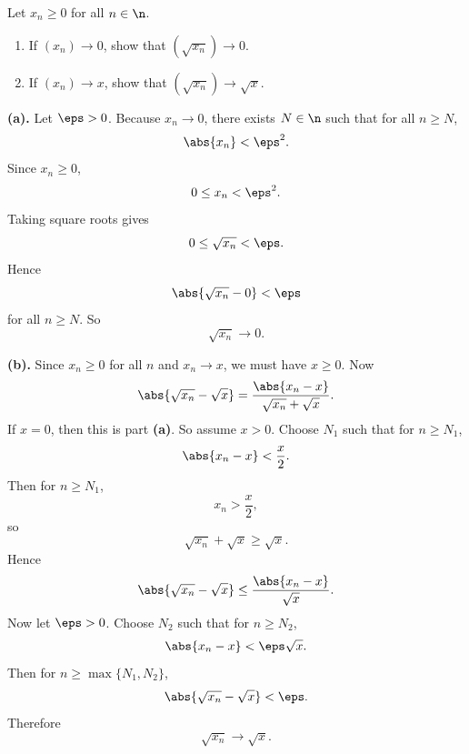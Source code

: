 \begin{problem}{
    Let $x_n\geq0$ for all $n\in\n$.
    \begin{enumerate}[label={(\alph*)}]
\item If $(x_n)\to0$, show that $(\sqrt{x_n})\to0$.
\item If $(x_n)\to x$, show that $(\sqrt{x_n})\to\sqrt{x}$.
    \end{enumerate}
}
    \textbf{(a).}
    Let $\eps>0$.
    Because $x_n\to0$, there exists $N\in\n$ such that for all $n\geq N$,
    \[
        \abs{x_n}<\eps^2.
    \]
    Since $x_n\geq0$,
    \[
        0\leq x_n<\eps^2.
    \]
    Taking square roots gives
    \[
        0\leq \sqrt{x_n}<\eps.
    \]
    Hence
    \[
        \abs{\sqrt{x_n}-0}<\eps
    \]
    for all $n\geq N$.
    So
    \[
        \sqrt{x_n}\to0.
    \]

    \textbf{(b).}
    Since $x_n\geq0$ for all $n$ and $x_n\to x$, we must have $x\geq0$.
    Now
    \[
        \abs{\sqrt{x_n}-\sqrt{x}}
        =
        \frac{\abs{x_n-x}}{\sqrt{x_n}+\sqrt{x}}.
    \]
    If $x=0$, then this is part \textbf{(a)}.
    So assume $x>0$.
    Choose $N_1$ such that for $n\geq N_1$,
    \[
        \abs{x_n-x}<\frac{x}{2}.
    \]
    Then for $n\geq N_1$,
    \[
        x_n>\frac{x}{2},
    \]
    so
    \[
        \sqrt{x_n}+\sqrt{x}\geq \sqrt{x}.
    \]
    Hence
    \[
        \abs{\sqrt{x_n}-\sqrt{x}}
        \leq \frac{\abs{x_n-x}}{\sqrt{x}}.
    \]
    Now let $\eps>0$.
    Choose $N_2$ such that for $n\geq N_2$,
    \[
        \abs{x_n-x}<\eps\sqrt{x}.
    \]
    Then for $n\geq \max\{N_1,N_2\}$,
    \[
        \abs{\sqrt{x_n}-\sqrt{x}}<\eps.
    \]
    Therefore
    \[
        \sqrt{x_n}\to\sqrt{x}.
    \]
\end{problem}

